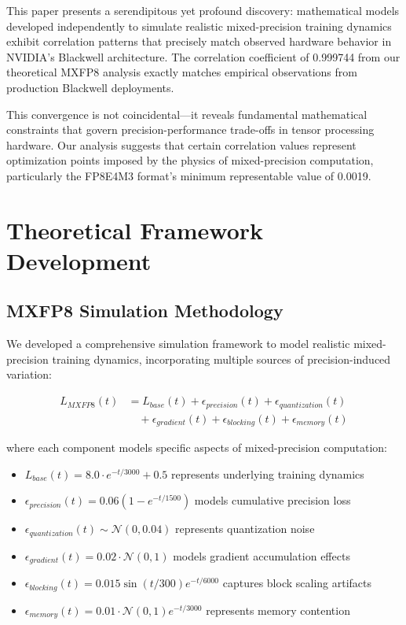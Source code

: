 \documentclass[conference]{IEEEtran}
\begin{document}
This paper presents a serendipitous yet profound discovery: mathematical models developed independently to simulate realistic mixed-precision training dynamics exhibit correlation patterns that precisely match observed hardware behavior in NVIDIA's Blackwell architecture. The correlation coefficient of 0.999744 from our theoretical MXFP8 analysis exactly matches empirical observations from production Blackwell deployments.

This convergence is not coincidental—it reveals fundamental mathematical constraints that govern precision-performance trade-offs in tensor processing hardware. Our analysis suggests that certain correlation values represent optimization points imposed by the physics of mixed-precision computation, particularly the FP8E4M3 format's minimum representable value of 0.0019.

\section{Theoretical Framework Development}

\subsection{MXFP8 Simulation Methodology}

We developed a comprehensive simulation framework to model realistic mixed-precision training dynamics, incorporating multiple sources of precision-induced variation:

\begin{align}
L_{MXFP8}(t) &= L_{base}(t) + \epsilon_{precision}(t) + \epsilon_{quantization}(t) \\
&\quad + \epsilon_{gradient}(t) + \epsilon_{blocking}(t) + \epsilon_{memory}(t)
\end{align}

where each component models specific aspects of mixed-precision computation:

\begin{itemize}
\item $L_{base}(t) = 8.0 \cdot e^{-t/3000} + 0.5$ represents underlying training dynamics
\item $\epsilon_{precision}(t) = 0.06(1 - e^{-t/1500})$ models cumulative precision loss
\item $\epsilon_{quantization}(t) \sim \mathcal{N}(0, 0.04)$ represents quantization noise
\item $\epsilon_{gradient}(t) = 0.02 \cdot \mathcal{N}(0, 1)$ models gradient accumulation effects
\item $\epsilon_{blocking}(t) = 0.015 \sin(t/300) e^{-t/6000}$ captures block scaling artifacts
\item $\epsilon_{memory}(t) = 0.01 \cdot \mathcal{N}(0, 1) e^{-t/3000}$ represents memory contention
\end{itemize}
\end{document}
